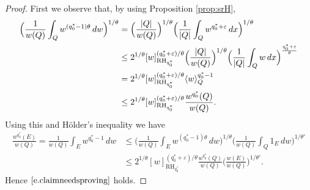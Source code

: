 \documentclass[11pt,reqno]{amsart}
\theoremstyle{plain} %
\newcommand{\1}{ \mathbbm{1}}   %
\theoremstyle{definition}
\theoremstyle{remark}
\numberwithin{equation}{section}
\begin{document}
\begin{proof}
First we observe that, by using Proposition \ref{prop:srH}, %
\begin{align}
\label{eq:aux2}
\notag\Big(\frac{1}{w(Q)}\int_Qw^{(q_0^*-1)\theta}\,dw\Big)^{1/\theta}&=\Big(\frac{|Q|}{w(Q)}\Big)^{1/\theta}\Big(\frac{1}{|Q|}\int_Qw^{q_0^*+\varepsilon}\,dx\Big)^{1/\theta}\\
\notag& \leq 2^{1/\theta}[w]_{\operatorname{RH}_{q_0^*}}^{(q_0^*+\varepsilon)/\theta}\Big(\frac{|Q|}{w(Q)}\Big)^{1/\theta}\Big(\frac{1}{|Q|}\int_Qw\,dx\Big)^{\frac{q_0^*+\varepsilon}{\theta}}\\
&=2^{1/\theta} [w]_{\operatorname{RH}_{q_0^*}}^{(q_0^*+\varepsilon)/\theta}\langle w\rangle_Q^{q_0^*-1} \\
& \leq 2^{1/\theta}[w]_{\operatorname{RH}_{q_0^*}}^{(q_0^*+\varepsilon)/\theta} \frac{w^{q_0^*}(Q)}{w(Q)}.
\end{align}
Using this and H\"older's inequality we have
\begin{align*}
\frac{w^{q_0^*}(E)}{w(Q)}=\frac{1}{w(Q)}\int_Ew^{q_0^*-1}\,dw&\le \Big(\frac{1}{w(Q)}\int_Ew^{(q_0^*-1)\theta}\,dw\Big)^{1/\theta}\Big(\frac{1}{w(Q)}\int_Q1_E\,dw\Big)^{1/\theta'}\\
&\leq 2^{1/\theta}[w]_{\operatorname{RH}_{q_0^*}}^{(q_0^*+\varepsilon)/\theta} \frac{w^{q_0^*}(Q)}{w(Q)}\Big(\frac{w(E)}{w(Q)}\Big)^{1/\theta'}.
\end{align*}
Hence $\eqref{e.claimneedsproving}$ holds.

\end{proof}
\end{document}
